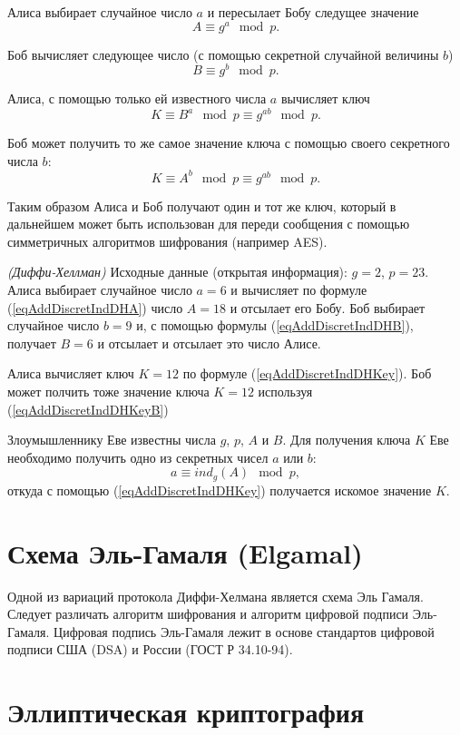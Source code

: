 Алиса выбирает случайное число $a$ и пересылает Бобу следущее значение
\begin{equation}
A \equiv g^a \mod{p}.
\label{eqAddDiscretIndDHA}
\end{equation}

Боб вычисляет следующее число (с помощью секретной случайной величины
$b$)
\begin{equation}
B \equiv g^b \mod{p}.
\label{eqAddDiscretIndDHB}
\end{equation}

Алиса, с помощью только ей известного числа $a$ вычисляет ключ
\begin{equation}
K \equiv B^a\mod{p} \equiv g^{ab} \mod{p}.
\label{eqAddDiscretIndDHKey}
\end{equation}

Боб может получить то же самое значение ключа с помощью своего
секретного числа $b$:
\begin{equation}
K \equiv A^b\mod{p} \equiv g^{ab} \mod{p}.
\label{eqAddDiscretIndDHKeyB}
\end{equation}

Таким образом Алиса и Боб получают один и тот же ключ, который в
дальнейшем может быть использован для переди сообщения с помощью
симметричных алгоритмов шифрования (например AES).

\begin{example}
\emph{(Диффи-Хеллман)}
Исходные данные (открытая информация): $g = 2$, $p = 23$. Алиса
выбирает случайное число $a = 6$ и вычисляет по формуле
(\ref{eqAddDiscretIndDHA}) число 
$A = 18$ и отсылает его Бобу.
Боб выбирает случайное число $b=9$ и, с помощью формулы 
(\ref{eqAddDiscretIndDHB}), получает
$B = 6$ и отсылает и отсылает это число Алисе.

Алиса вычисляет ключ 
$K = 12$ по формуле (\ref{eqAddDiscretIndDHKey}). Боб может полчить
тоже значение ключа 
$K = 12$ используя (\ref{eqAddDiscretIndDHKeyB})
\nonumber
\end{example}

Злоумышленнику Еве известны числа $g$, $p$, $A$ и $B$. Для получения
ключа $K$ Еве необходимо получить одно из секретных чисел $a$ или $b$:
\begin{equation}
a \equiv ind_g\left( A \right) \mod{p},
\nonumber
\end{equation}
откуда с помощью (\ref{eqAddDiscretIndDHKey}) получается искомое
значение $K$.

\section{Схема Эль-Гамаля (Elgamal)}
Одной из вариаций протокола Диффи-Хелмана является схема Эль
Гамаля. Следует различать алгоритм шифрования и алгоритм цифровой
подписи Эль-Гамаля. Цифровая подпись Эль-Гамаля лежит в основе
стандартов цифровой подписи США (DSA) и России (ГОСТ Р 34.10-94).

\section{Эллиптическая криптография}

